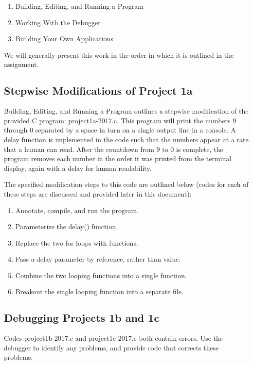 \documentclass[letterpaper, 12pt]{article}
\begin{document}
\begin{enumerate}
    \item  Building, Editing, and Running a Program
    \item  Working With the Debugger
    \item Building Your Own Applications
\end{enumerate}

We will generally present this work in the order in which it is outlined in the assignment.

\subsection{Stepwise Modifications of Project 1a}
\label{sec:stepwise_mod_spec}

Building, Editing, and Running a Program outlines a stepwise modification of the provided C program:  project1a-2017.c.  This program will print the numbers 9 through 0 separated by a space in turn on a single output line in a console.  A delay function is implemented in the code such that the numbers appear at a rate that a human can read.  After  the countdown from 9 to 0 is complete, the program removes each number in the order it was printed from the terminal display, again with a delay for human readability.

The specified modification steps to this code are outlined below (codes for each of these steps are discussed and provided later in this document):

\begin{enumerate}
    \item Annotate, compile, and run the program.
    \item Parameterize the delay() function.
    \item Replace  the two for loops with  functions.
    \item Pass a delay parameter by reference, rather than value.
    \item Combine the two looping functions into a single function.
    \item Breakout the single looping function into a separate file.
\end{enumerate}

\subsection{Debugging Projects 1b and 1c}
Codes project1b-2017.c and project1c-2017.c both contain errors.  Use the debugger to identify any problems, and provide code that corrects these problems.
\end{document}
